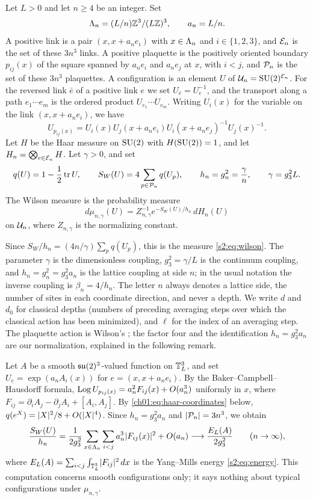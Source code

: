 \begin{definition}\label{ch01:def:ensemble}
Let $L>0$ and let $n\ge4$ be an integer. Set
\[
 \Lambda_{n}=(L/n)\mathbb Z^3/(L\mathbb Z)^3,\qquad a_n=L/n.
\]
A positive link is a pair $(x,x+a_ne_i)$ with $x\in\Lambda_{n}$ and $i\in\{1,2,3\}$, and $\mathcal E_{n}$ is the set of these $3n^3$ links. A positive plaquette is the positively oriented boundary $p_{ij}(x)$ of the square spanned by $a_ne_i$ and $a_ne_j$ at $x$, with $i<j$, and $\mathcal P_{n}$ is the set of these $3n^3$ plaquettes. A configuration is an element $U$ of $\mathcal U_{n}=\mathrm{SU}(2)^{\mathcal E_{n}}$. For the reversed link $\bar e$ of a positive link $e$ we set $U_{\bar e}=U_e^{-1}$, and the transport along a path $e_1\cdots e_m$ is the ordered product $U_{e_1}\cdots U_{e_m}$. Writing $U_i(x)$ for the variable on the link $(x,x+a_ne_i)$, we have
\[
 U_{p_{ij}(x)}=U_i(x)U_j(x+a_ne_i)U_i(x+a_ne_j)^{-1}U_j(x)^{-1}.
\]
Let $H$ be the Haar measure on $\mathrm{SU}(2)$ with $H(\mathrm{SU}(2))=1$, and let $H_n=\bigotimes_{e\in\mathcal E_{n}}H$. Let $\gamma>0$, and set
\[
 q(U)=1-\frac12\operatorname{tr} U,\qquad S_W(U)=4\sum_{p\in\mathcal P_{n}}q(U_p),\qquad h_n=g_n^2=\frac{\gamma}{n},\qquad \gamma=g_3^2L.
\]
The Wilson measure is the probability measure
\[
 d\mu_{n,\gamma}(U)=Z_{n,\gamma}^{-1}e^{-S_W(U)/h_n}\,dH_n(U)
\]
on $\mathcal U_{n}$, where $Z_{n,\gamma}$ is the normalizing constant.
\end{definition}

Since $S_W/h_n=(4n/\gamma)\sum_pq(U_p)$, this is the measure \eqref{s2:eq:wilson}. The parameter $\gamma$ is the dimensionless coupling, $g_3^2=\gamma/L$ is the continuum coupling, and $h_n=g_n^2=g_3^2a_n$ is the lattice coupling at side $n$; in the usual notation the inverse coupling is $\beta_n=4/h_n$. The letter $n$ always denotes a lattice side, the number of sites in each coordinate direction, and never a depth. We write $d$ and $d_0$ for classical depths (numbers of preceding averaging steps over which the classical action has been minimized), and $\ell$ for the index of an averaging step. The plaquette action is Wilson's \cite{Wilson1974}; the factor four and the identification $h_n=g_3^2a_n$ are our normalization, explained in the following remark.

\begin{remark}\label{ch01:rem:normalization}
Let $A$ be a smooth $\mathfrak{su}(2)^3$-valued function on $\mathbb T_L^3$, and set $U_e=\exp(a_nA_i(x))$ for $e=(x,x+a_ne_i)$. By the Baker--Campbell--Hausdorff formula, $\operatorname{Log} U_{p_{ij}(x)}=a_n^2F_{ij}(x)+O(a_n^3)$ uniformly in $x$, where $F_{ij}=\partial_iA_j-\partial_jA_i+[A_i,A_j]$. By \eqref{ch01:eq:haar-coordinates} below, $q(e^X)=\lvert X\rvert^2/8+O(\lvert X\rvert^4)$. Since $h_n=g_3^2a_n$ and $\lvert \mathcal P_{n}\rvert=3n^3$, we obtain
\[
 \frac{S_W(U)}{h_n}=\frac{1}{2g_3^2}\sum_{x\in\Lambda_{n}}\sum_{i<j}a_n^3\lvert F_{ij}(x)\rvert^2+O(a_n)\longrightarrow\frac{E_L(A)}{2g_3^2}\qquad(n\to\infty),
\]
where $E_L(A)=\sum_{i<j}\int_{\mathbb T_L^3}\lvert F_{ij}\rvert^2\,dx$ is the Yang--Mills energy \eqref{s2:eq:energy}. This computation concerns smooth configurations only; it says nothing about typical configurations under $\mu_{n,\gamma}$.
\end{remark}

